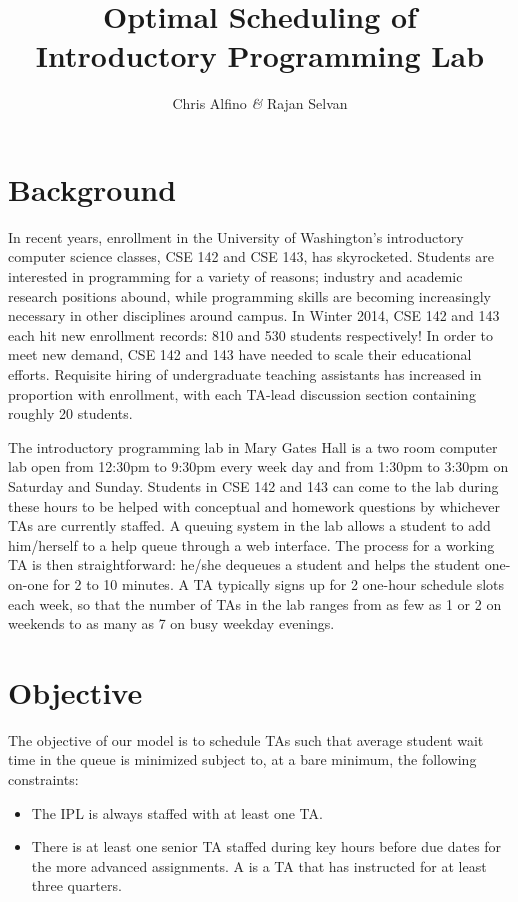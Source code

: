 \documentclass{article}
\begin{document}
\title{\textbf{Optimal Scheduling of Introductory Programming Lab}}
\author{Chris Alfino \textit{\&} Rajan Selvan}
\maketitle

\setlength\columnsep{0.45in}
\setlength{\parskip}{0.5em}
\begin{multicols}{2}

\section*{Background}

In recent years, enrollment in the University of Washington's introductory computer science classes, CSE 142 and CSE 143, has skyrocketed. Students are interested in programming for a variety of reasons; industry and academic research positions abound, while programming skills are becoming increasingly necessary in other disciplines around campus. In Winter 2014, CSE 142 and 143 each hit new enrollment records: 810 and 530 students respectively! In order to meet new demand, CSE 142 and 143 have needed to scale their educational efforts. Requisite hiring of undergraduate teaching assistants has increased in proportion with enrollment, with each TA-lead discussion section containing roughly 20 students.

The introductory programming lab in Mary Gates Hall is a two room computer lab open from 12:30pm to 9:30pm every week day and from 1:30pm to 3:30pm on Saturday and Sunday. Students in CSE 142 and 143 can come to the lab during these hours to be helped with conceptual and homework questions by whichever TAs are currently staffed. A queuing system in the lab allows a student to add him/herself to a help queue through a web interface. The process for a working TA is then straightforward: he/she dequeues a student and helps the student one-on-one for 2 to 10 minutes. A TA typically signs up for 2 one-hour schedule slots each week, so that the number of TAs in the lab ranges from as few as 1 or 2 on weekends to as many as 7 on busy weekday evenings.

\section*{Objective}

The objective of our model is to schedule TAs such that average student wait time in the queue is minimized subject to, at a bare minimum, the following constraints:
\begin{itemize}
    \item The IPL is always staffed with at least one TA.
    \item There is at least one senior TA staffed during key hours before due dates for the more advanced assignments. A  is a TA that has instructed for at least three quarters.
\end{itemize}


\end{multicols}
\end{document}
